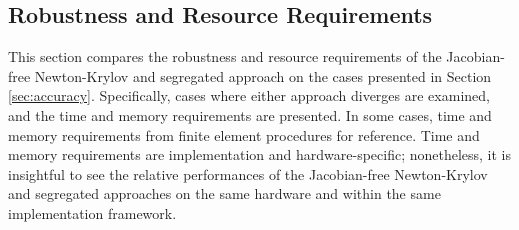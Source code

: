 \documentclass[sn-mathphys,Numbered]{sn-jnl}%
\begin{document}
\subsection{Robustness and Resource Requirements}
\label{sec:resource_requirements}
This section compares the robustness and resource requirements of the Jacobian-free Newton-Krylov and segregated approach on the cases presented in Section \ref{sec:accuracy}.
Specifically, cases where either approach diverges are examined, and the time and memory requirements are presented.
In some cases, time and memory requirements from finite element procedures for reference.
Time and memory requirements are implementation and hardware-specific; nonetheless, it is insightful to see the relative performances of the Jacobian-free Newton-Krylov and segregated approaches on the same hardware and within the same implementation framework.
\end{document}
